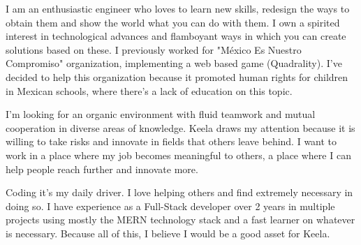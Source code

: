 \documentclass[11pt, a4paper]{awesome-cv}
\begin{document}
\makecvheader

\makelettertitle

\begin{cvletter}
I am an enthusiastic engineer who loves to learn new skills, redesign the ways to obtain them and show the world what you can do with them. I own a spirited interest in technological advances and flamboyant ways in which you can create solutions based on these. I previously worked for "México Es Nuestro Compromiso" organization, implementing a web based game (Quadrality). I've decided to help this organization because it promoted human rights for children in Mexican schools, where there's a lack of education on this topic. 

I'm looking for an organic environment with fluid teamwork and mutual cooperation in diverse areas of knowledge. Keela draws my attention because it is willing to take risks and innovate in fields that others leave behind. I want to work in a place where my job becomes meaningful to others, a place where I can help people reach further and innovate more.

 Coding it's my daily driver. I love helping others and find extremely necessary in doing so. I have experience as a Full-Stack developer over 2 years in multiple projects using mostly the MERN technology stack and a fast learner on whatever is necessary. Because all of this, I believe I would be a good asset for Keela.
 
\end{cvletter}

\makeletterclosing
\end{document}
